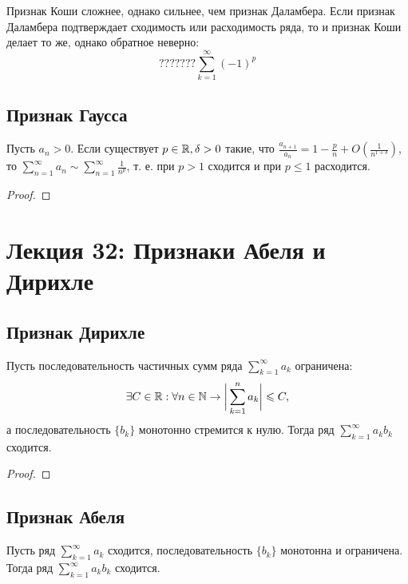 	\begin{example}
		Признак Коши сложнее, однако сильнее, чем признак Даламбера. Если признак Даламбера подтверждает сходимость или расходимость ряда, то и признак Коши делает то же, однако обратное неверно:
		\[ ??????? \sum_{k = 1}^{\infty} {(-1)^p} \]
	\end{example}
	
	\subsection{Признак Гаусса}
	
	\begin{theorem}
		Пусть $a_n > 0$. Если существует $p \in \mathbb R, \delta > 0$ такие, что $\frac{a_{n + 1}}{a_n} = 1 - \frac{p}{n} + O(\frac{1}{n^{1 + \delta}})$, то $\displaystyle \sum_{n = 1}^{\infty} a_n \sim \sum_{n = 1}^{\infty} {\frac{1}{n^p}}$, т. е. при $p > 1$ сходится и при $p \leqslant 1$ расходится.
	\end{theorem}
	
	\begin{proof}
	\end{proof}
	
	\section{Лекция 32: Признаки Абеля и Дирихле}
	
	\subsection{Признак Дирихле}
	
	\begin{theorem}
		Пусть последовательность частичных сумм ряда $\displaystyle \sum_{k = 1}^{\infty} {a_k}$ ограничена:
		\[ \exists C \in \mathbb R: \forall n \in \mathbb N \rightarrow \bigg|\sum_{k = 1}^n {a_k}\bigg| \leqslant C, \]
		а последовательность $\{b_k\}$ монотонно стремится к нулю. Тогда ряд $\displaystyle \sum_{k = 1}^{\infty} a_k b_k$ сходится.
	\end{theorem}
	
	\begin{proof}
	\end{proof}
	
	\subsection{Признак Абеля}
	
	\begin{theorem}
		Пусть ряд $\displaystyle \sum_{k = 1}^{\infty} {a_k}$ сходится, последовательность $\{b_k\}$ монотонна и ограничена. Тогда ряд $\displaystyle \sum_{k = 1}^{\infty} a_k b_k$ сходится.
	\end{theorem}
	
